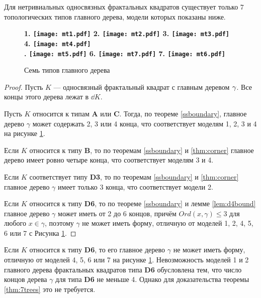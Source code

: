 \begin{theorem}\label{thm:7trees}
Для нетривиальных односвязных фрактальных квадратов существует только $7$ топологических типов главного дерева, модели которых показаны ниже.
\end{theorem}

\begin{figure}[H]
    \centering \Large {\bf
    1. \texttt{[image: mt1.pdf]}
    \hfill
    2. \texttt{[image: mt2.pdf]}
    \hfill
    3. \texttt{[image: mt3.pdf]}
    \hfill
    4. \texttt{[image: mt4.pdf]}\\
    . \texttt{[image: mt5.pdf]}
    \hfill
    6. \texttt{[image: mt7.pdf]}
    \hfill
    7. \texttt{[image: mt6.pdf]}}
    \caption{Семь типов главного дерева}
    \label{fig:7trees}
\end{figure}

\begin{proof}
Пусть $K$ --- односвязный фрактальный квадрат с главным деревом $\gamma$. 
Все концы этого дерева лежат в $\dd K$.

Пусть $K$ относится к типам {\bf A} или {\bf C}. 
Тогда, по теореме \ref{ssboundary}, главное дерево $\gamma$ может содержать 2, 3 или 4 конца, что соответствует моделям 1, 2, 3 и 4 на рисунке \ref{fig:7trees}.

Если $K$ относится к типу {\bf B}, то по теоремам \ref{ssboundary} и \ref{thm:corner} главное дерево имеет ровно четыре конца, что соответствует моделям 3 и 4.

Если $K$ соответствует типу {\bf D3}, то по теоремам \ref{ssboundary} и \ref{thm:corner} главное дерево $\gamma$ имеет только 3 конца, что соответствует модели 2.

Если $K$ относится к типу {\bf D6}, то по теореме \ref{ssboundary} и лемме \ref{lem:d4bound} главное дерево $\gamma$ может иметь от 2 до 6 концов, причём $ Ord(x,\gamma)\leq3$ для любого $x\in \gamma$, поэтому $\gamma$ не может иметь форму, отличную от моделей 1, 2, 4, 5, 6 или 7 с Рисунка \ref{fig:7trees}.
\end{proof}


\begin{remark}
Если $K$ относится к типу {\bf D6}, то его главное дерево $\gamma$ не может иметь форму, отличную от моделей 4, 5, 6 или 7 на рисунке \ref{fig:7trees}.
Невозможность моделей 1 и 2 главного дерева фрактальных квадратов типа {\bf D6} обусловлена тем, что число концов дерева $\gamma$ для типа {\bf D6} не меньше 4.
Однако для доказательства теоремы \ref{thm:7trees} это не требуется.
\end{remark}

